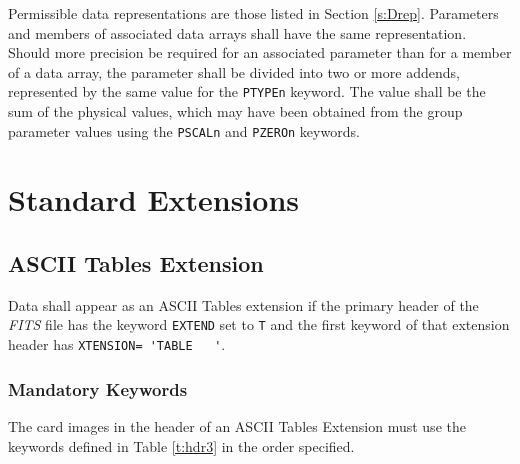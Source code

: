   Permissible data representations are those listed in Section 
  \ref{s:Drep}.  Parameters and members of associated
data
  arrays shall have the same representation.  Should more precision
  be required for an associated parameter than for a member of a data
  array, the parameter shall be divided into two or more addends,
represented
  by the same value for the {\tt PTYPEn} keyword. 
  The value shall be the sum of the physical values, 
  which may have been obtained 
  from the group parameter values 
  using 
  the {\tt PSCALn} and {\tt PZEROn} keywords.
  
  \chapter{ Standard Extensions}
     \label{s:exts}

  \section{ASCII Tables Extension}
     \label{s:ATabl}
   Data shall 
   appear as an ASCII Tables extension if the primary
   header of the {\em FITS\/} file has the keyword
   {\tt EXTEND} set to {\tt T} and the first keyword of 
   that extension
   header has \verb*+XTENSION= 'TABLE   '+.
   
   \subsection{Mandatory Keywords}
       \label{s:atmk}
   The card images in the header of an ASCII
Tables
   Extension must use the keywords defined in Table \ref{t:hdr3}
   in the order
   specified.
  
